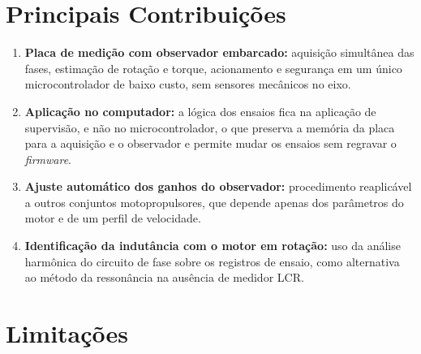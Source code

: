 \section{Principais Contribuições}
\label{sec:contribuicoes}

\begin{enumerate}
    \item \textbf{Placa de medição com observador embarcado:} aquisição
    simultânea das fases, estimação de rotação e torque, acionamento e
    segurança em um único microcontrolador de baixo custo, sem sensores
    mecânicos no eixo.
    \item \textbf{Aplicação no computador:} a lógica dos ensaios fica na
    aplicação de supervisão, e não no microcontrolador, o que preserva a
    memória da placa para a aquisição e o observador e permite mudar os
    ensaios sem regravar o \textit{firmware}.
    \item \textbf{Ajuste automático dos ganhos do observador:} procedimento
    reaplicável a outros conjuntos motopropulsores, que depende apenas dos
    parâmetros do motor e de um perfil de velocidade.
    \item \textbf{Identificação da indutância com o motor em rotação:} uso da
    análise harmônica do circuito de fase sobre os registros de ensaio, como
    alternativa ao método da ressonância na ausência de medidor LCR.
\end{enumerate}

\section{Limitações}
\label{sec:limitacoes}

